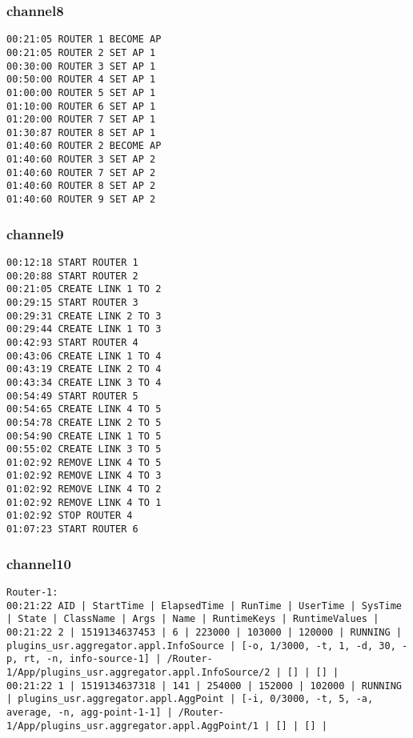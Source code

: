 \subsubsection*{channel8}

\begin{lstlisting}[language=config]
00:21:05 ROUTER 1 BECOME AP 
00:21:05 ROUTER 2 SET AP 1 
00:30:00 ROUTER 3 SET AP 1 
00:50:00 ROUTER 4 SET AP 1 
01:00:00 ROUTER 5 SET AP 1 
01:10:00 ROUTER 6 SET AP 1 
01:20:00 ROUTER 7 SET AP 1 
01:30:87 ROUTER 8 SET AP 1 
01:40:60 ROUTER 2 BECOME AP 
01:40:60 ROUTER 3 SET AP 2 
01:40:60 ROUTER 7 SET AP 2 
01:40:60 ROUTER 8 SET AP 2 
01:40:60 ROUTER 9 SET AP 2 
\end{lstlisting}


\subsubsection*{channel9}

\begin{lstlisting}[language=config]
00:12:18 START ROUTER 1
00:20:88 START ROUTER 2
00:21:05 CREATE LINK 1 TO 2
00:29:15 START ROUTER 3
00:29:31 CREATE LINK 2 TO 3
00:29:44 CREATE LINK 1 TO 3
00:42:93 START ROUTER 4
00:43:06 CREATE LINK 1 TO 4
00:43:19 CREATE LINK 2 TO 4
00:43:34 CREATE LINK 3 TO 4
00:54:49 START ROUTER 5
00:54:65 CREATE LINK 4 TO 5
00:54:78 CREATE LINK 2 TO 5
00:54:90 CREATE LINK 1 TO 5
00:55:02 CREATE LINK 3 TO 5
01:02:92 REMOVE LINK 4 TO 5
01:02:92 REMOVE LINK 4 TO 3
01:02:92 REMOVE LINK 4 TO 2
01:02:92 REMOVE LINK 4 TO 1
01:02:92 STOP ROUTER 4
01:07:23 START ROUTER 6
\end{lstlisting}



\subsubsection*{channel10}

\begin{lstlisting}[language=config]
Router-1:
00:21:22 AID | StartTime | ElapsedTime | RunTime | UserTime | SysTime | State | ClassName | Args | Name | RuntimeKeys | RuntimeValues | 
00:21:22 2 | 1519134637453 | 6 | 223000 | 103000 | 120000 | RUNNING | plugins_usr.aggregator.appl.InfoSource | [-o, 1/3000, -t, 1, -d, 30, -p, rt, -n, info-source-1] | /Router-1/App/plugins_usr.aggregator.appl.InfoSource/2 | [] | [] | 
00:21:22 1 | 1519134637318 | 141 | 254000 | 152000 | 102000 | RUNNING | plugins_usr.aggregator.appl.AggPoint | [-i, 0/3000, -t, 5, -a, average, -n, agg-point-1-1] | /Router-1/App/plugins_usr.aggregator.appl.AggPoint/1 | [] | [] | 
\end{lstlisting}


